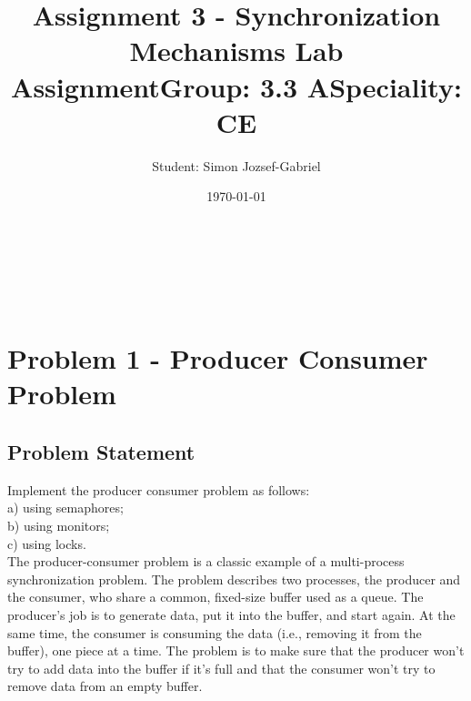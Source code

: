 \documentclass[14pt]{article}
\begin{document}
\title{\huge Assignment 3 - Synchronization Mechanisms Lab Assignment}
\date{\today}
\maketitle
\begin{center}
\vspace{30 mm}

\author{\huge Student: Simon Jozsef-Gabriel}
\\\vspace{10 mm}
\title{\huge Group: 3.3 A}
\\\vspace{10 mm}
\title{\huge Speciality: CE}
\date{}
\maketitle
\end{center}
\newpage
\tableofcontents
\newpage

\section{Problem 1 - Producer Consumer Problem}
\subsection{Problem Statement}
Implement the producer consumer problem as follows:
\\a) using semaphores;
\\b) using monitors;
\\c) using locks.
\vspace{2.5 mm}
\\ The producer-consumer problem is a classic example of a multi-process synchronization problem. The problem describes two processes, the producer and the consumer, who share a common, fixed-size buffer used as a queue. The producer's job is to generate data, put it into the buffer, and start again. At the same time, the consumer is consuming the data (i.e., removing it from the buffer), one piece at a time. The problem is to make sure that the producer won't try to add data into the buffer if it's full and that the consumer won't try to remove data from an empty buffer.
\end{document}
